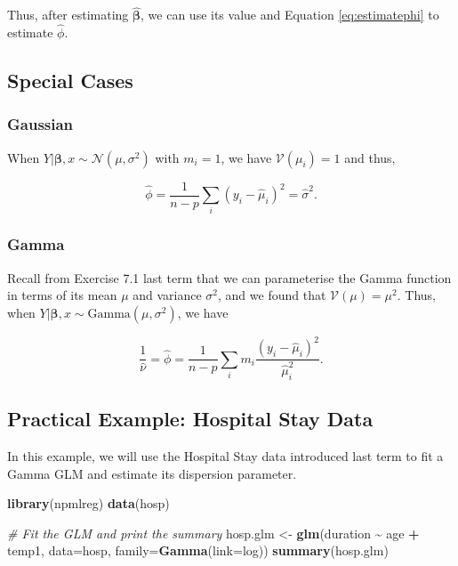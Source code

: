 \documentclass[
  12pt,
]{book}
\newenvironment{Shaded}{\begin{snugshade}}{\end{snugshade}}
\newcommand{\AttributeTok}[1]{\textcolor[rgb]{0.13,0.29,0.53}{#1}}
\newcommand{\CommentTok}[1]{\textcolor[rgb]{0.56,0.35,0.01}{\textit{#1}}}
\newcommand{\FunctionTok}[1]{\textcolor[rgb]{0.13,0.29,0.53}{\textbf{#1}}}
\newcommand{\NormalTok}[1]{#1}
\newcommand{\OtherTok}[1]{\textcolor[rgb]{0.56,0.35,0.01}{#1}}
\newcommand{\SpecialCharTok}[1]{\textcolor[rgb]{0.81,0.36,0.00}{\textbf{#1}}}
\begin{document}
Thus, after estimating \(\hat{\boldsymbol{\beta}}\), we can use its value and Equation \eqref{eq:estimatephi} to estimate \(\hat{\phi}\).

\subsection{Special Cases}\label{special-cases}

\subsubsection{Gaussian}\label{gaussian}

When \(Y |\boldsymbol{\beta}, x \sim {\mathcal N}(\mu, \sigma^{2})\) with \(m_i = 1\), we have \(\mathcal{V}(\mu_{i}) = 1\) and thus,

\begin{equation}
  \hat{\phi} 
  = \frac{1}{n - p} \sum_{i} (y_{i} - \hat{\mu}_{i})^{2}
  = \hat{\sigma}^{2}.
\end{equation}

\subsubsection{Gamma}\label{gamma}

Recall from Exercise 7.1 last term that we can parameterise the Gamma function in terms of its mean \(\mu\) and variance \(\sigma^{2}\), and we found that \(\mathcal{V}(\mu) = \mu^2\). Thus, when \(Y |\boldsymbol{\beta}, x \sim \text{Gamma}(\mu, \sigma^{2})\), we have

\begin{equation}
  \frac{1}{\hat{\nu}}
  = \hat{\phi}
  = \frac{1}{n - p} \sum_{i} m_{i} \frac{(y_{i} - \hat{\mu}_{i})^{2}}{\hat{\mu}_{i}^{2}}.
\end{equation}

\subsection{Practical Example: Hospital Stay Data}\label{practical-example-hospital-stay-data}

In this example, we will use the Hospital Stay data introduced last term to fit a Gamma GLM and estimate its dispersion parameter.

\begin{Shaded}
\begin{Highlighting}[]
\FunctionTok{library}\NormalTok{(npmlreg)}
\FunctionTok{data}\NormalTok{(hosp)}

\CommentTok{\# Fit the GLM and print the summary}
\NormalTok{hosp.glm }\OtherTok{\textless{}{-}} \FunctionTok{glm}\NormalTok{(duration }\SpecialCharTok{\textasciitilde{}}\NormalTok{ age }\SpecialCharTok{+}\NormalTok{ temp1, }\AttributeTok{data=}\NormalTok{hosp, }\AttributeTok{family=}\FunctionTok{Gamma}\NormalTok{(}\AttributeTok{link=}\NormalTok{log))}
\FunctionTok{summary}\NormalTok{(hosp.glm)}
\end{Highlighting}
\end{Shaded}
\end{document}
